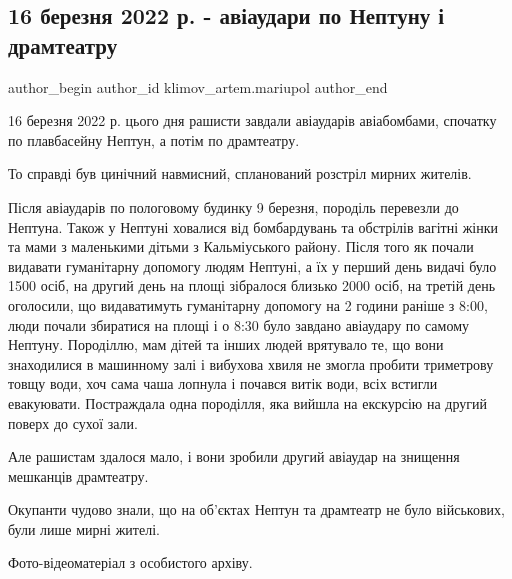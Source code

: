  
 
 
 
 

\subsection{16 березня 2022 р. - авіаудари по Нептуну і драмтеатру}
\label{sec:16_03_2023.fb.klimov_artem.mariupol.1.16_bereznya_2022_r__}

\ifcmt
 author_begin
   author_id klimov_artem.mariupol
 author_end
\fi

16 березня 2022 р. цього дня рашисти завдали авіаударів авіабомбами, спочатку
по плавбасейну Нептун, а потім по драмтеатру.

То справді був цинічний навмисний, спланований розстріл мирних жителів.

Після авіаударів по пологовому будинку 9 березня, породіль перевезли до
Нептуна. Також у Нептуні ховалися від бомбардувань та обстрілів вагітні жінки
та мами з маленькими дітьми з Кальміуського району. Після того як почали
видавати гуманітарну допомогу людям Нептуні, а їх у перший день видачі було
1500 осіб, на другий день на площі зібралося близько 2000 осіб, на третій день
оголосили, що видаватимуть гуманітарну допомогу на 2 години раніше з 8:00, люди
почали збиратися на площі і о 8:30 було завдано авіаудару по самому Нептуну.
Породіллю, мам дітей та інших людей врятувало те, що вони знаходилися в
машинному залі і вибухова хвиля не змогла пробити триметрову товщу води, хоч
сама чаша лопнула і почався витік води, всіх встигли евакуювати. Постраждала
одна породілля, яка вийшла на екскурсію на другий поверх до сухої зали.

Але рашистам здалося мало, і вони зробили другий авіаудар на знищення мешканців
драмтеатру.

Окупанти чудово знали, що на об'єктах Нептун та драмтеатр не було військових,
були лише мирні жителі.

Фото-відеоматеріал з особистого архіву.
